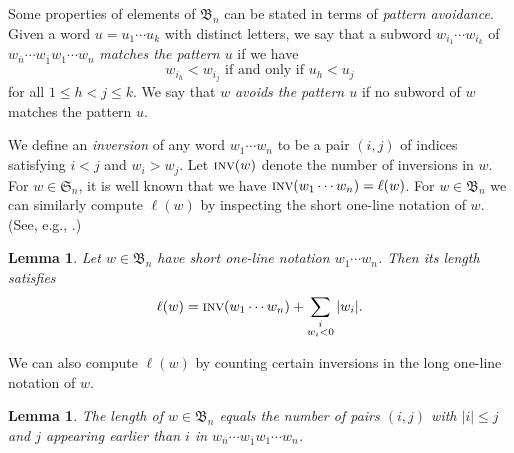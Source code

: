 \documentclass[12pt]{amsart}
\newtheorem{lem}[thm]{Lemma}
\theoremstyle{definition}
\numberwithin{equation}{section}
\newcommand{\sn}{\mathfrak{S}_n}
\newcommand{\bn}{\mathfrak{B}_n}
\newcommand{\ol}[1]{\overline{#1}}
\newcommand{\sumsb}[1]{\sum_{\substack{#1}}}  %
\newcommand{\inv}{\textsc{inv}}
\begin{document}
Some properties of elements of $\bn$ can be stated in terms of {\em pattern avoidance}.  Given a word $u = u_1 \cdots u_k$ with distinct letters, we say that a subword $w_{i_1} \cdots w_{i_k}$ of $w_{\ol n} \cdots w_{\ol1} w_1 \cdots w_n$ {\em matches the pattern $u$} if we have
\begin{equation*}
    w_{i_h} < w_{i_j}
    \text{ if and only if }
    u_h < u_j
\end{equation*}
    for all $1 \leq h < j \leq k$.
    We say that $w$ {\em avoids the pattern $u$} if no subword of $w$ matches the pattern $u$.

We define an \emph{inversion} of any word $w_1 \cdots w_n$ to be a pair $(i,j)$ of indices satisfying $i < j$ and $w_i > w_j$. Let $\inv(w)$ denote the number of inversions in $w$. For $w \in \sn$, it is well known that we have $\inv(w_1 \cdots w_n) = \ell(w)$. For $w \in \bn$ we can similarly compute $\ell(w)$ by inspecting the short one-line notation of $w$.  (See, e.g., \cite[Prop.\,8.1.1,  Eqn.\,(8.2)]{BBCoxeter}.)
\begin{lem}\label{l:BClength}
  Let $w \in \bn$ have short one-line notation $w_1 \cdots w_n$.
  Then its length satisfies
  \begin{equation*}
    \ell(w) = \inv(w_1 \cdots w_n) + \sumsb{i\\w_i < 0} |w_i|.
  \end{equation*}
\end{lem}
\noindent We can also compute $\ell(w)$ by counting certain inversions in the long one-line notation of $w$.
\begin{lem}\label{l:longinversions}
The length of $w \in \bn$ equals the number of pairs $(i,j)$ with $|i| \leq j$ and $j$ appearing earlier than $i$ in
    $w_{\ol n} \cdots w_{\ol1} w_1 \cdots w_n$.
    \end{lem}
\end{document}
